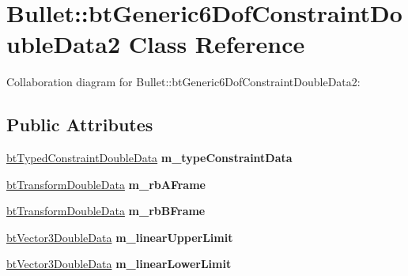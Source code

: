 \hypertarget{class_bullet_1_1bt_generic6_dof_constraint_double_data2}{\section{Bullet\+:\+:bt\+Generic6\+Dof\+Constraint\+Double\+Data2 Class Reference}
\label{class_bullet_1_1bt_generic6_dof_constraint_double_data2}
}


Collaboration diagram for Bullet\+:\+:bt\+Generic6\+Dof\+Constraint\+Double\+Data2\+:
\subsection*{Public Attributes}
\begin{DoxyCompactItemize}
\item 
\hypertarget{class_bullet_1_1bt_generic6_dof_constraint_double_data2_ac61a954546f513b7a2a4b3000c8dada9}{\hyperlink{class_bullet_1_1bt_typed_constraint_double_data}{bt\+Typed\+Constraint\+Double\+Data} {\bfseries m\+\_\+type\+Constraint\+Data}}\label{class_bullet_1_1bt_generic6_dof_constraint_double_data2_ac61a954546f513b7a2a4b3000c8dada9}

\item 
\hypertarget{class_bullet_1_1bt_generic6_dof_constraint_double_data2_a3b762cbdfd3c129cc228a78d00fef2c3}{\hyperlink{class_bullet_1_1bt_transform_double_data}{bt\+Transform\+Double\+Data} {\bfseries m\+\_\+rb\+A\+Frame}}\label{class_bullet_1_1bt_generic6_dof_constraint_double_data2_a3b762cbdfd3c129cc228a78d00fef2c3}

\item 
\hypertarget{class_bullet_1_1bt_generic6_dof_constraint_double_data2_a950112e8ae08c7c1bf2b659f62912e8c}{\hyperlink{class_bullet_1_1bt_transform_double_data}{bt\+Transform\+Double\+Data} {\bfseries m\+\_\+rb\+B\+Frame}}\label{class_bullet_1_1bt_generic6_dof_constraint_double_data2_a950112e8ae08c7c1bf2b659f62912e8c}

\item 
\hypertarget{class_bullet_1_1bt_generic6_dof_constraint_double_data2_a6251fb6316e342c20b624f5015d3dea4}{\hyperlink{class_bullet_1_1bt_vector3_double_data}{bt\+Vector3\+Double\+Data} {\bfseries m\+\_\+linear\+Upper\+Limit}}\label{class_bullet_1_1bt_generic6_dof_constraint_double_data2_a6251fb6316e342c20b624f5015d3dea4}

\item 
\hypertarget{class_bullet_1_1bt_generic6_dof_constraint_double_data2_ac24afbb5e122982c60aece8a9e444319}{\hyperlink{class_bullet_1_1bt_vector3_double_data}{bt\+Vector3\+Double\+Data} {\bfseries m\+\_\+linear\+Lower\+Limit}}\label{class_bullet_1_1bt_generic6_dof_constraint_double_data2_ac24afbb5e122982c60aece8a9e444319}


\end{DoxyCompactItemize}
